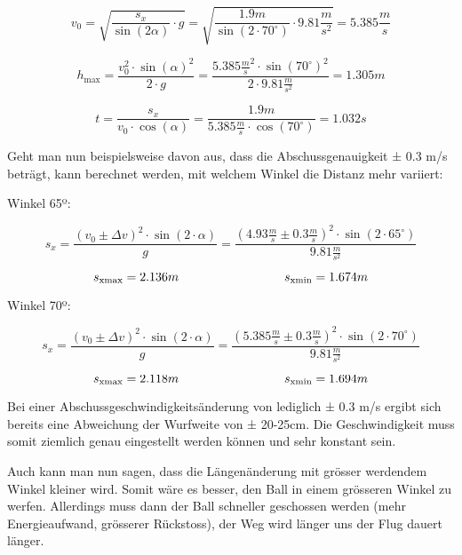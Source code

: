 \[ v_0 = \sqrt{ \frac{s_x}{\sin(2\alpha)} \cdot g } = \sqrt{ \frac{1.9m}{\sin(2 \cdot 70^\circ)} \cdot 9.81 \frac{m}{s^2}} = 5.385 \frac{m}{s} \]

\[ h_\text{max} = \frac{v_0^2 \cdot \sin(\alpha)^2}{2 \cdot g} = \frac{5.385 \frac{m}{s}^2 \cdot \sin(70^\circ)^2}{2 \cdot 9.81 \frac{m}{s^2}} = 1.305m \]

\[ t = \frac{s_x}{v_0 \cdot \cos(\alpha)} = \frac{1.9m}{5.385 \frac{m}{s} \cdot \cos(70^\circ)} = 1.032s \]

Geht man nun beispielsweise davon aus, dass die Abschussgenauigkeit ± 0.3 m/s beträgt, kann berechnet werden, mit welchem Winkel die Distanz mehr variiert:

Winkel 65º:

\[ s_x = \frac{(v_0 \pm \Delta v)^2 \cdot \sin(2 \cdot \alpha)}{g} = \frac{(4.93 \frac{m}{s} \pm 0.3 \frac{m}{s})^2 \cdot \sin(2 \cdot 65^\circ)}{9.81 \frac{m}{s^2}} \]

\[ s_\text{xmax} = 2.136m \hspace{30mm} s_\text{xmin} = 1.674m \]

Winkel 70º:

\[ s_x = \frac{(v_0 \pm \Delta v)^2 \cdot \sin(2 \cdot \alpha)}{g} = \frac{(5.385 \frac{m}{s} \pm 0.3 \frac{m}{s})^2 \cdot \sin(2 \cdot 70^\circ)}{9.81 \frac{m}{s^2}} \]

\[ s_\text{xmax} = 2.118m \hspace{30mm} s_\text{xmin} = 1.694m \]

Bei einer Abschussgeschwindigkeitsänderung von lediglich ± 0.3 m/s ergibt sich bereits eine Abweichung der Wurfweite von ± 20-25cm. Die Geschwindigkeit muss somit ziemlich genau eingestellt werden können und sehr konstant sein.

Auch kann man nun sagen, dass die Längenänderung mit grösser werdendem Winkel kleiner wird. Somit wäre es besser, den Ball in einem grösseren Winkel zu werfen. Allerdings muss dann der Ball schneller geschossen werden (mehr Energieaufwand, grösserer Rückstoss), der Weg wird länger uns der Flug dauert länger.